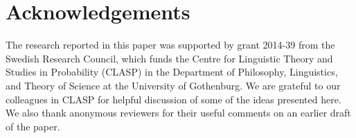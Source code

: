 \documentclass[11pt,a4paper]{article}
\begin{document}
\else
\section*{Acknowledgements}
The research reported in this paper was supported by grant 2014-39 from the
Swedish Research Council, which funds the Centre for Linguistic Theory and
Studies in Probability (CLASP) in the Department of Philosophy, Linguistics,
and Theory of Science at the University of Gothenburg. We are grateful to
our colleagues in CLASP for helpful discussion of some of the ideas presented
here. We also thank anonymous reviewers for their useful comments on an
earlier draft of the paper.\fi





\end{document}
